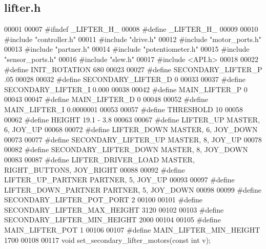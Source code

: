 \subsection{lifter.\+h}
\label{lifter_8h_source}

\begin{DoxyCode}
00001 
00007 \textcolor{preprocessor}{#ifndef \_LIFTER\_H\_}
00008 \textcolor{preprocessor}{#define \_LIFTER\_H\_}
00009 
00010 \textcolor{preprocessor}{#include "controller.h"}
00011 \textcolor{preprocessor}{#include "drive.h"}
00012 \textcolor{preprocessor}{#include "motor_ports.h"}
00013 \textcolor{preprocessor}{#include "partner.h"}
00014 \textcolor{preprocessor}{#include "potentiometer.h"}
00015 \textcolor{preprocessor}{#include "sensor_ports.h"}
00016 \textcolor{preprocessor}{#include "slew.h"}
00017 \textcolor{preprocessor}{#include <API.h>}
00018 
00022 \textcolor{preprocessor}{#define INIT\_ROTATION 680}
00023 
00027 \textcolor{preprocessor}{#define SECONDARY\_LIFTER\_P .05}
00028 
00032 \textcolor{preprocessor}{#define SECONDARY\_LIFTER\_D 0}
00033 
00037 \textcolor{preprocessor}{#define SECONDARY\_LIFTER\_I 0.000}
00038 
00042 \textcolor{preprocessor}{#define MAIN\_LIFTER\_P 0}
00043 
00047 \textcolor{preprocessor}{#define MAIN\_LIFTER\_D 0}
00048 
00052 \textcolor{preprocessor}{#define MAIN\_LIFTER\_I 0.0000001}
00053 
00057 \textcolor{preprocessor}{#define THRESHOLD 10}
00058 
00062 \textcolor{preprocessor}{#define HEIGHT 19.1 - 3.8}
00063 
00067 \textcolor{preprocessor}{#define LIFTER\_UP MASTER, 6, JOY\_UP}
00068 
00072 \textcolor{preprocessor}{#define LIFTER\_DOWN MASTER, 6, JOY\_DOWN}
00073 
00077 \textcolor{preprocessor}{#define SECONDARY\_LIFTER\_UP MASTER, 8, JOY\_UP}
00078 
00082 \textcolor{preprocessor}{#define SECONDARY\_LIFTER\_DOWN MASTER, 8, JOY\_DOWN}
00083 
00087 \textcolor{preprocessor}{#define LIFTER\_DRIVER\_LOAD MASTER, RIGHT\_BUTTONS, JOY\_RIGHT}
00088 
00092 \textcolor{preprocessor}{#define LIFTER\_UP\_PARTNER PARTNER, 5, JOY\_UP}
00093 
00097 \textcolor{preprocessor}{#define LIFTER\_DOWN\_PARTNER PARTNER, 5, JOY\_DOWN}
00098 
00099 \textcolor{preprocessor}{#define SECONDARY\_LIFTER\_POT\_PORT 2}
00100 
00101 \textcolor{preprocessor}{#define SECONDARY\_LIFTER\_MAX\_HEIGHT 3120}
00102 
00103 \textcolor{preprocessor}{#define SECONDARY\_LIFTER\_MIN\_HEIGHT 2000}
00104 
00105 \textcolor{preprocessor}{#define MAIN\_LIFTER\_POT 1}
00106 
00107 \textcolor{preprocessor}{#define MAIN\_LIFTER\_MIN\_HEIGHT 1700}
00108 
00117 \textcolor{keywordtype}{void} set_secondary_lifter_motors(\textcolor{keyword}{const} \textcolor{keywordtype}{int} v);

\end{DoxyCode}
